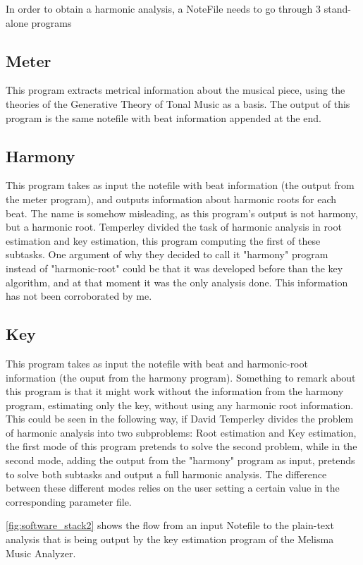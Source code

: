   In order to obtain a harmonic analysis, a NoteFile needs to go through 3 stand-alone programs

  \subsection{Meter}
    This program extracts metrical information about the musical piece, using the theories of the Generative Theory of Tonal Music as a basis.
    The output of this program is the same notefile with beat information appended at the end.
  \subsection{Harmony}
    This program takes as input the notefile with beat information (the output from the meter program), and outputs information about harmonic roots for each beat. The name is somehow misleading, as this program's output is not harmony, but a harmonic root. Temperley divided the task of harmonic analysis in root estimation and key estimation, this program computing the first of these subtasks. One argument of why they decided to call it "harmony" program instead of "harmonic-root" could be that it was developed before than the key algorithm, and at that moment it was the only analysis done. This information has not been corroborated by me.
  \subsection{Key}
    This program takes as input the notefile with beat and harmonic-root information (the ouput from the harmony program). Something to remark about this program is that it might work without the information from the harmony program, estimating only the key, without using any harmonic root information. This could be seen in the following way, if David Temperley divides the problem of harmonic analysis into two subproblems: Root estimation and Key estimation, the first mode of this program pretends to solve the second problem, while in the second mode, adding the output from the "harmony" program as input, pretends to solve both subtasks and output a full harmonic analysis. The difference between these different modes relies on the user setting a certain value in the corresponding parameter file.

    \autoref{fig:software_stack2} shows the flow from an input Notefile to the plain-text analysis that is being output by the key estimation program of the Melisma Music Analyzer.

